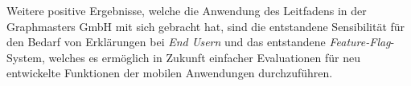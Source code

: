 Weitere positive Ergebnisse, welche die Anwendung des Leitfadens in der Graphmasters GmbH mit sich gebracht hat, sind die entstandene Sensibilität für den Bedarf von Erklärungen bei \textit{End Usern} und das entstandene \textit{Feature-Flag}-System, welches es ermöglich in Zukunft einfacher Evaluationen für neu entwickelte Funktionen der mobilen Anwendungen durchzuführen.


\newpage

